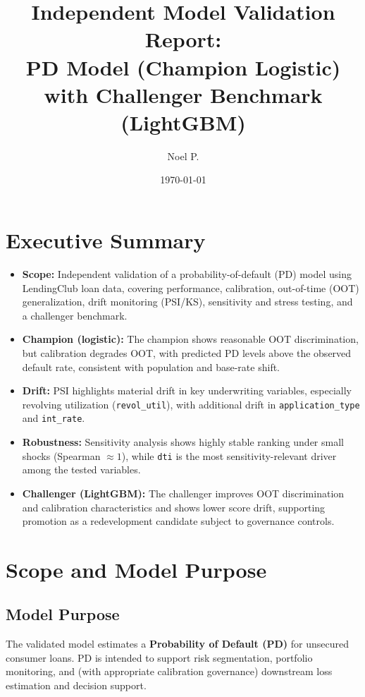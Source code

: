 \documentclass[11pt,a4paper]{article}
\title{Independent Model Validation Report:\\PD Model (Champion Logistic) with Challenger Benchmark (LightGBM)}
\author{Noel P.}
\date{\today}
\begin{document}
\maketitle

\vspace{-0.6em}

\section*{Executive Summary}
\begin{itemize}[leftmargin=*, itemsep=0.35em]
\item \textbf{Scope:} Independent validation of a probability-of-default (PD) model using LendingClub loan data, covering performance, calibration, out-of-time (OOT) generalization, drift monitoring (PSI/KS), sensitivity and stress testing, and a challenger benchmark.
\item \textbf{Champion (logistic):} The champion shows reasonable OOT discrimination, but calibration degrades OOT, with predicted PD levels above the observed default rate, consistent with population and base-rate shift.
\item \textbf{Drift:} PSI highlights material drift in key underwriting variables, especially revolving utilization (\texttt{revol\_util}), with additional drift in \texttt{application\_type} and \texttt{int\_rate}.
\item \textbf{Robustness:} Sensitivity analysis shows highly stable ranking under small shocks (Spearman $\approx 1$), while \texttt{dti} is the most sensitivity-relevant driver among the tested variables.
\item \textbf{Challenger (LightGBM):} The challenger improves OOT discrimination and calibration characteristics and shows lower score drift, supporting promotion as a redevelopment candidate subject to governance controls.
\end{itemize}

\section{Scope and Model Purpose}

\subsection{Model Purpose}
The validated model estimates a \textbf{Probability of Default (PD)} for unsecured consumer loans. PD is intended to support risk segmentation, portfolio monitoring, and (with appropriate calibration governance) downstream loss estimation and decision support.
\end{document}
